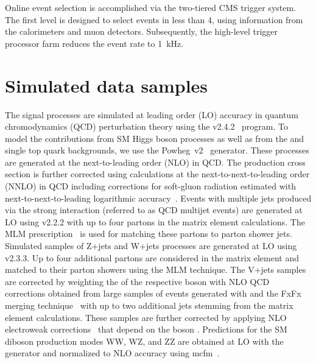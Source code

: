 %                                                                                                                                                                                                    
%                                                                                                                                                                                                    
Online event selection is accomplished via the two-tiered CMS trigger
system. The first level is designed to select events in less than
4\mus, using information from the calorimeters and muon detectors.
%                                                                                                                                                                                                    
Subsequently, the high-level trigger processor farm reduces the event rate to 1~kHz.


\section{Simulated data samples}

The signal processes are simulated at leading order (LO) accuracy in quantum chromodynamics (QCD) perturbation theory using the  v2.4.2~\cite{amcatnlo} program.
%
To model the contributions from SM Higgs boson processes as well as
from the \ttbar and single top quark backgrounds, we use the {\sc Powheg~v2}~\cite{Nason:2004rx,Frixione:2007vw,Alioli:2010xd} generator. These processes are generated at the next-to-leading order (NLO) in QCD. The \ttbar production 
cross section is further corrected using calculations at the next-to-next-to-leading order (NNLO) in QCD including corrections for soft-gluon radiation estimated with next-to-next-to-leading logarithmic accuracy~\cite{ttbarNNLO}. 
% 
Events with multiple jets produced via the strong interaction (referred to as QCD multijet events) are generated at LO using  v2.2.2 with up to four partons in the matrix element calculations. The MLM prescription~\cite{mlm} is used for matching these partons to parton shower jets.
%
Simulated samples of Z+jets and W+jets processes are generated at LO using  v2.3.3. Up to four additional partons are considered in the matrix element and matched to their parton showers using the MLM technique.
%
The V+jets samples are corrected by weighting the \pt of the respective boson with NLO QCD corrections obtained from large samples of events generated with  and the FxFx merging technique~\cite{fxfx} with up to two additional jets stemming from the matrix element calculations.
%
These samples are further corrected by applying NLO electroweak corrections~\cite{Kuhn:2005gv,Kallweit:2015fta,Kallweit:2015dum} that depend on the boson \pt.
%
Predictions for the SM diboson production modes WW, WZ, and ZZ are obtained at LO with the {\sc {}}~\cite{Sjostrand:2014zea} generator and normalized to NLO accuracy using {\sc mcfm}~\cite{MCFM}. 
%


